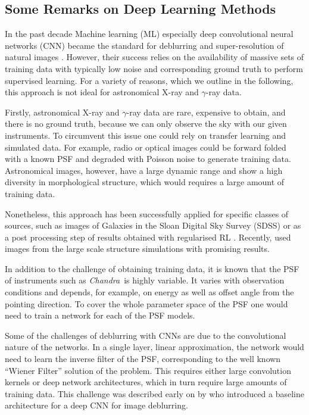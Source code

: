 \documentclass[twocolumn, linenumbers]{aastex631}
\newcommand{\chandra}{\textit{Chandra}~}
\newcommand{\gammaray}{$\gamma$-ray\xspace}
\newcommand{\xray}{X-ray\xspace}
\begin{document}
    \subsection{Some Remarks on Deep Learning Methods}
    In the past decade Machine learning (ML) especially deep convolutional neural networks (CNN) became the standard for deblurring and super-resolution of natural images \citep{Zhang2022}. However, their success relies on the availability of massive sets of training data with typically low noise and corresponding ground truth to perform supervised learning. For a variety of reasons, which we outline in the following, this approach is not ideal for astronomical \xray and \gammaray data.
    
    Firstly, astronomical \xray and \gammaray data are rare, expensive to obtain, and there is no ground truth, because we can only observe the sky with our given instruments. To circumvent this issue one could rely on transfer learning and simulated data. For example, radio or optical images could be forward folded with a known PSF and degraded with Poisson noise to generate training data.  Astronomical images, however, have a large dynamic range and show a high diversity in morphological structure, which would requires a large amount of training data.  

    Nonetheless, this approach has been successfully applied for specific classes of sources, such as images of Galaxies in the Sloan Digital Sky Survey (SDSS) \citep{Schawinski2017} or as a post processing step of results obtained with regularised RL \citep{Akhaury2022}. Recently, \cite{Sweere2022} used images from the large scale structure simulations with promising results.

    In addition to the challenge of obtaining training data, it is known that the PSF of instruments such as \chandra is highly variable. It varies with observation conditions and depends, for example, on energy as well as offset angle from the pointing direction. To cover the whole parameter space of the PSF one would need to train a network for each of the PSF models.

    Some of the challenges of deblurring with CNNs are due to the convolutional nature of the networks. In a single layer, linear approximation, the network would need to learn the inverse filter of the PSF, corresponding to the well known \enquote{Wiener Filter} solution of the problem. This requires either large convolution kernels or deep network architectures, which in turn require large amounts of training data. This challenge was described early on by \cite{Li2014} who introduced a baseline architecture for a deep CNN for image deblurring.
    
\end{document}
